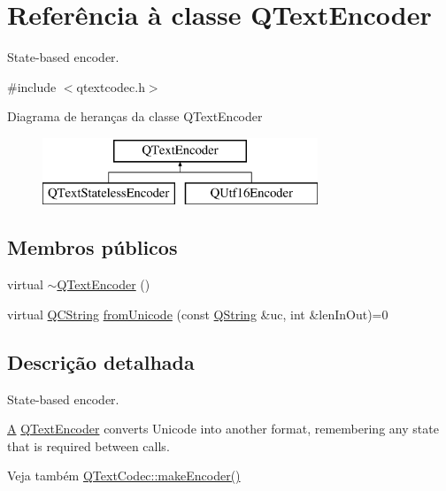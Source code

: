 \hypertarget{class_q_text_encoder}{\section{Referência à classe Q\-Text\-Encoder}
\label{class_q_text_encoder}
}


State-\/based encoder.  




{\ttfamily \#include $<$qtextcodec.\-h$>$}

Diagrama de heranças da classe Q\-Text\-Encoder\begin{figure}[H]
\begin{center}
\leavevmode
\includegraphics[height=2.000000cm]{class_q_text_encoder}
\end{center}
\end{figure}
\subsection*{Membros públicos}
\begin{DoxyCompactItemize}
\item 
virtual \hyperlink{class_q_text_encoder_a77b64606163fcffa2e373ad7f373a272}{$\sim$\-Q\-Text\-Encoder} ()
\item 
virtual \hyperlink{class_q_c_string}{Q\-C\-String} \hyperlink{class_q_text_encoder_aacab43367cc5203dd9ec329729914442}{from\-Unicode} (const \hyperlink{class_q_string}{Q\-String} \&uc, int \&len\-In\-Out)=0
\end{DoxyCompactItemize}


\subsection{Descrição detalhada}
State-\/based encoder. 

\hyperlink{class_a}{A} \hyperlink{class_q_text_encoder}{Q\-Text\-Encoder} converts Unicode into another format, remembering any state that is required between calls.

\begin{DoxySeeAlso}{Veja também}
\hyperlink{class_q_text_codec_af324249beeb8b0b38aa7b32ba7c8c09f}{Q\-Text\-Codec\-::make\-Encoder()} 
\end{DoxySeeAlso}



